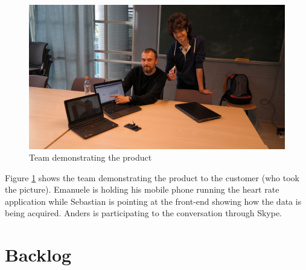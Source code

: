 \begin{figure}[H]
\centering
\includegraphics[scale=0.40]{../Figures/demo-m1.jpg}
\caption{Team demonstrating the product}
\label{figure:demonstration-m1}
\end{figure}

Figure \ref{figure:demonstration-m1} shows the team demonstrating the product to the customer (who took the picture).
Emanuele is holding his mobile phone running the heart rate application while Sebastian is pointing at the front-end showing how the data is being acquired. 
Anders is participating to the conversation through Skype.

\clearpage
\section{Backlog}


